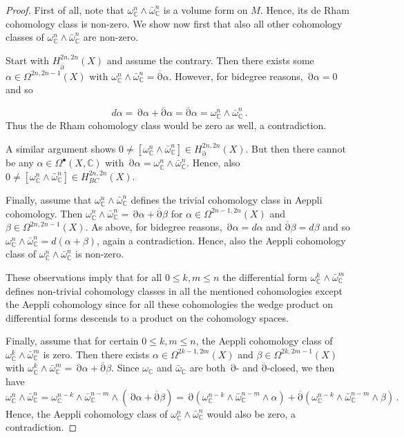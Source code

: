\documentclass[a4paper]{amsart}
\theoremstyle{definition}
\theoremstyle{remark}
\newcommand{\bC}{{\mathbb C}}
\newcommand{\delbar}{\operatorname{\overline{\partial}}}
\newcommand{\del}{\operatorname{\partial}}
\numberwithin{equation}{section}
\begin{document}
\begin{proof}
First of all, note that $\omega_\mathbb{C}^n\wedge\bar\omega_\mathbb{C}^n$ is a volume form on $M$. Hence, its de Rham cohomology class is non-zero. We show now first that also all other cohomology classes of $\omega_\mathbb{C}^n\wedge\bar \omega_\mathbb{C}^n$ are non-zero.
		
Start with $H^{2n,2n}_{\delbar}(X)$ and assume the contrary. Then there exists some $\alpha\in \Omega^{2n,2n-1}(X)$ with $\omega_\mathbb{C}^n\wedge\bar \omega_\mathbb{C}^n=\delbar \alpha$. However, for bidegree reasons, $\del\alpha=0$ and so

\[
d\alpha=\del \alpha+\delbar\alpha=\delbar\alpha=\omega_\mathbb{C}^n\wedge\bar \omega_\mathbb{C}^n\,.
\]
Thus the de Rham cohomology class would be zero as well, a contradiction.
		
A similar argument shows $0\neq [\omega_\mathbb{C}^n\wedge\bar \omega_\mathbb{C}^n]\in H^{2n,2n}_{\del}(X)$. But then there cannot be any $\alpha\in \Omega^{\bullet}(X,\bC)$ with $\del \alpha=\omega_\mathbb{C}^n\wedge\bar \omega_\mathbb{C}^n$. Hence, also $0\neq [\omega_\mathbb{C}^n\wedge\bar \omega_\mathbb{C}^n]\in H^{2n,2n}_{BC}(X)$.
		
Finally, assume that $\omega_\mathbb{C}^n\wedge\bar \omega_\mathbb{C}^n$ defines the trivial cohomology class in Aeppli cohomology. Then $\omega_\mathbb{C}^n\wedge\bar \omega_\mathbb{C}^n=\del \alpha+\delbar \beta$ for $\alpha\in  \Omega^{2n-1,2n}(X)$ and $\beta\in \Omega^{2n,2n-1}(X)$. As above, for bidegree reasons, $\del\alpha=d\alpha$ and $\delbar\beta=d\beta$ and so $\omega_\mathbb{C}^n\wedge\bar \omega_\mathbb{C}^n=d(\alpha+\beta)$, again a contradiction. Hence, also the Aeppli cohomology class of $\omega_\mathbb{C}^n\wedge\bar \omega_\mathbb{C}^n$ is non-zero.
		
These observations imply that for all $0\leq k,m\leq n$ the differential form $\omega_\mathbb{C}^k\wedge\bar \omega_\mathbb{C}^m$ defines non-trivial cohomology classes in all the mentioned cohomologies except the Aeppli cohomology since for all these cohomologies the wedge product on differential forms descends to a product on the cohomology spaces.
		
Finally, assume that for certain $0\leq k,m\leq n$, the Aeppli cohomology class of $\omega_\mathbb{C}^k\wedge\bar \omega_\mathbb{C}^m$ is zero. Then there exists $\alpha\in \Omega^{2k-1,2m}(X)$ and $\beta\in \Omega^{2k,2m-1}(X)$ with $\omega_\mathbb{C}^k\wedge\bar \omega_\mathbb{C}^m=\del \alpha+\delbar \beta$. Since $\omega_{\bC}$ and $\bar\omega_{\bC}$ are both $\del$- and $\delbar$-closed, we then have
\[
\omega_\mathbb{C}^n\wedge\bar \omega_\mathbb{C}^n=\omega_\mathbb{C}^{n-k}\wedge\bar \omega_\mathbb{C}^{n-m}\wedge (\del \alpha+\delbar \beta)=\del(\omega_\mathbb{C}^{n-k}\wedge\bar \omega_\mathbb{C}^{n-m}\wedge \alpha)+\delbar(\omega_\mathbb{C}^{n-k}\wedge\bar \omega_\mathbb{C}^{n-m}\wedge \beta)\,.
\] 
Hence, the Aeppli cohomology class of $\omega_\mathbb{C}^n\wedge\bar \omega_\mathbb{C}^n$ would also be zero, a contradiction.
\end{proof}
\end{document}

